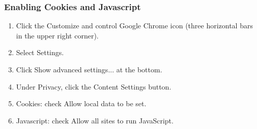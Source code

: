 \documentclass[hidelinks,english]{article}
\begin{document}
            \subsubsection{Enabling Cookies and Javascript}
            \begin{enumerate}
                \item Click the Customize and control Google Chrome icon (three horizontal bars in the upper right corner).
                \item Select Settings.
                \item Click Show advanced settings... at the bottom.
                \item Under Privacy, click the Content Settings button.
                \item Cookies: check Allow local data to be set.
                \item Javascript: check Allow all sites to run JavaScript.
            \end{enumerate}
            \begin{center}
            \end{center}
        \newpage
\end{document}
